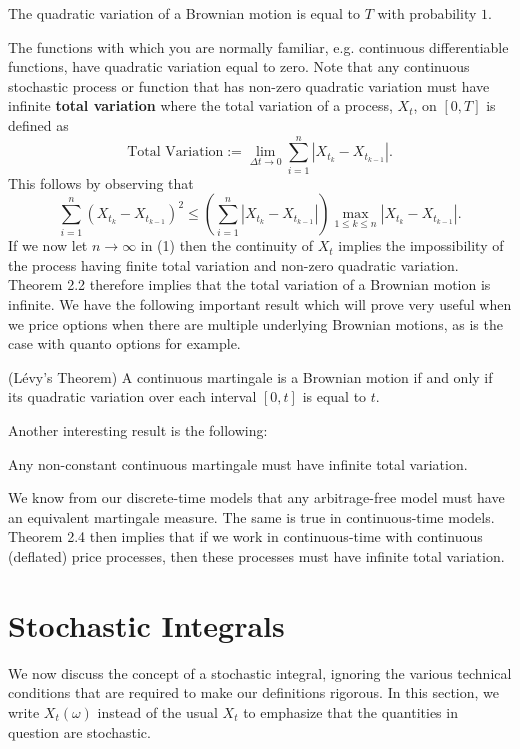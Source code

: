 \begin{theorem}
The quadratic variation of a Brownian motion is equal to $T$ with probability $1$.
\end{theorem}

The functions with which you are normally familiar, e.g. continuous differentiable functions, have quadratic variation equal to zero. Note that any continuous stochastic process or function that has non-zero quadratic variation must have infinite \textbf{total variation} where the total variation of a process, $X_{t}$, on $[0,T]$ is defined as
\[\text{Total Variation} := \lim_{\Delta t\to 0} \sum_{i=1}^{n}|X_{t_k}-X_{t_{k-1}}|.\]
This follows by observing that
\[\sum_{i=1}^{n}(X_{t_k}-X_{t_{k-1}})^2 \leq \left(\sum_{i=1}^{n}|X_{t_k}-X_{t_{k-1}}|\right) \max_{1\leq k\leq n}|X_{t_k}-X_{t_{k-1}}|. \tag{1}\]
If we now let $n\to\infty$ in (1) then the continuity of $X_t$ implies the impossibility of the process having finite total variation and non-zero quadratic variation. Theorem 2.2 therefore implies that the total variation of a Brownian motion is infinite. We have the following important result which will prove very useful when we price options when there are multiple underlying Brownian motions, as is the case with quanto options for example.

\begin{theorem} (L\'evy's Theorem)
A continuous martingale is a Brownian motion if and only if its quadratic variation over each interval $[0,t]$ is equal to $t$.
\end{theorem}

Another interesting result is the following:
\begin{theorem}
Any non-constant continuous martingale must have infinite total variation.
\end{theorem}
We know from our discrete-time models that any arbitrage-free model must have an equivalent martingale measure. The same is true in continuous-time models. Theorem 2.4 then implies that if we work in continuous-time with continuous (deflated) price processes, then these processes must have infinite total variation.

\section{Stochastic Integrals}
We now discuss the concept of a stochastic integral, ignoring the various technical conditions that are required to make our definitions rigorous. In this section, we write $X_{t}(\omega)$ instead of the usual $X_{t}$ to emphasize that the quantities in question are stochastic.

